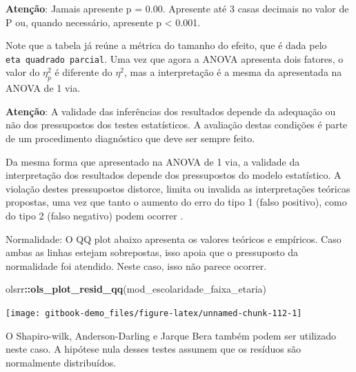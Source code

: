 \documentclass[
]{book}
\newenvironment{Shaded}{\begin{snugshade}}{\end{snugshade}}
\newcommand{\KeywordTok}[1]{\textcolor[rgb]{0.13,0.29,0.53}{\textbf{#1}}}
\newcommand{\NormalTok}[1]{#1}
\newcommand{\OperatorTok}[1]{\textcolor[rgb]{0.81,0.36,0.00}{\textbf{#1}}}
\begin{document}
\begin{warning}

\textbf{Atenção}: Jamais apresente p = 0.00. Apresente até 3 casas decimais no valor de P ou, quando necessário, apresente p \textless{} 0.001.

\end{warning}

Note que a tabela já reúne a métrica do tamanho do efeito, que é dada pelo \texttt{eta\ quadrado\ parcial}. Uma vez que agora a ANOVA apresenta dois fatores, o valor do \(\eta_p^2\) é diferente do \(\eta^2\), mas a interpretação é a mesma da apresentada na ANOVA de 1 via.

\begin{warning}

\textbf{Atenção}: A validade das inferências dos resultados depende da adequação ou não dos pressupostos dos testes estatísticos. A avaliação destas condições é parte de um procedimento diagnóstico que deve ser sempre feito.

\end{warning}

Da mesma forma que apresentado na ANOVA de 1 via, a validade da interpretação dos resultados depende dos pressupostos do modelo estatístico. A violação destes pressupostos distorce, limita ou invalida as interpretações teóricas propostas, uma vez que tanto o aumento do erro do tipo 1 (falso positivo), como do tipo 2 (falso negativo) podem ocorrer \citep{Lix1996, Barker2015, Ernst2017}.

Normalidade: O QQ plot abaixo apresenta os valores teóricos e empíricos. Caso ambas as linhas estejam sobrepostas, isso apoia que o pressuposto da normalidade foi atendido. Neste caso, isso não parece ocorrer.

\begin{Shaded}
\begin{Highlighting}[]
\NormalTok{olsrr}\OperatorTok{::}\KeywordTok{ols_plot_resid_qq}\NormalTok{(mod_escolaridade_faixa_etaria)}
\end{Highlighting}
\end{Shaded}

\begin{center}\texttt{[image: gitbook-demo\_files/figure-latex/unnamed-chunk-112-1]} \end{center}

O Shapiro-wilk, Anderson-Darling e Jarque Bera também podem ser utilizado neste caso. A hipótese nula desses testes assumem que os resíduos são normalmente distribuídos.
\end{document}

